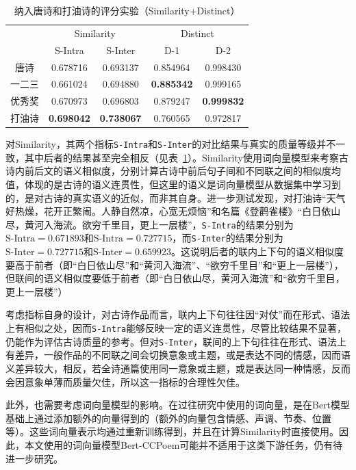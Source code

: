 \begin{table}[ht]
  \centering
  \caption{纳入唐诗和打油诗的评分实验（Similarity+Distinct）}
  \label{tab:test_scoring_all_dsr1_2}
  \begin{tabular}{ccccc}
      \toprule
      & \multicolumn{2}{c}{Similarity} & \multicolumn{2}{c}{Distinct}\\
      \cmidrule(r){2-3} \cmidrule(l){4-5} 
      & S-Intra& S-Inter& D-1& D-2\\
      \midrule
      唐诗	&	0.678716 	&	0.693137 	&	0.854964 	&	0.998430 	\\
      一二三	&	0.661024 	&	0.694880 	&	\bf{0.885342} 	&	0.999165 	\\
      优秀奖	&	0.670973 	&	0.696803 	&	0.879247 	&	\bf{0.999832} 	\\
      打油诗	&	\bf{0.698042} 	&	\bf{0.738067} 	&	0.760565 	&	0.972817 	\\

      \bottomrule
  \end{tabular}
\end{table}

对Similarity，其两个指标\verb|S-Intra|和\verb|S-Inter|的对比结果与真实的质量等级并不一致，其中后者的结果甚至完全相反（见表~\ref{tab:test_scoring_all_dsr1_2}）。Similarity使用词向量模型来考察古诗内前后文的语义相似度，分别计算古诗中前后句子间和不同联之间的相似度均值，体现的是古诗的语义连贯性，但这里的语义是词向量模型从数据集中学习到的，是对古诗的真实语义的近似，而非其自身。进一步测试发现，对打油诗“{\kaishu 天气好热燥，花开正繁闹。人静自然凉，心宽无烦恼}”和名篇《登鹳雀楼》“{\kaishu 白日依山尽，黄河入海流。欲穷千里目，更上一层楼}”，\verb|S-Intra|的结果分别为$\text{S-Intra}=0.671893$和$\text{S-Intra}=0.727715$，而\verb|S-Inter|的结果分别为$\text{S-Inter}=0.727715$和$\text{S-Inter}=0.659923$。这说明后者的联内上下句的语义相似度要高于前者（即“{\kaishu 白日依山尽}”和“{\kaishu 黄河入海流}”、“{\kaishu 欲穷千里目}”和“{\kaishu 更上一层楼}”），但联间的语义相似度要低于前者（即“{\kaishu 白日依山尽，黄河入海流}”和“{\kaishu 欲穷千里目，更上一层楼}”）

考虑指标自身的设计，对古诗作品而言，联内上下句往往因“对仗”而在形式、语法上有相似之处，因而\verb|S-Intra|能够反映一定的语义连贯性，尽管比较结果不显著，仍能作为评估古诗质量的参考。但对\verb|S-Inter|，联间的上下句往往在形式、语法上有差异，一般作品的不同联之间会切换意象或主题，或是表达不同的情感，因而语义差异较大，相反，若全诗通篇使用同一意象或主题，或是表达同一种情感，反而会因意象单薄而质量欠佳，所以这一指标的合理性欠佳。

此外，也需要考虑词向量模型的影响。在过往研究中使用的词向量，是在Bert模型基础上通过添加额外的向量得到的（额外的向量包含情感、声调、节奏、位置等）。这些词向量表示均通过重新训练得到，并且在计算Similarity时直接使用。因此，本文使用的词向量模型Bert-CCPoem可能并不适用于这类下游任务，仍有待进一步研究。

